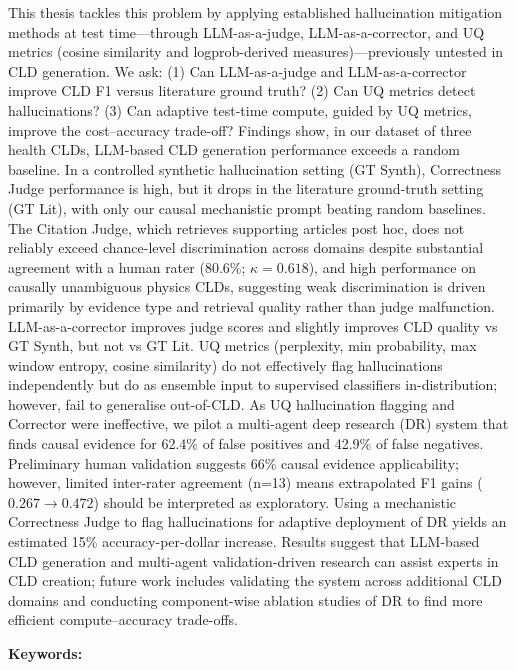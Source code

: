 \documentclass[11pt, oneside]{Thesis} %
\begin{document}
{This thesis tackles this problem by applying established hallucination mitigation methods at test time---through LLM-as-a-judge, LLM-as-a-corrector, and UQ metrics (cosine similarity and logprob-derived measures)---previously untested in CLD generation. We ask: (1) Can LLM-as-a-judge and LLM-as-a-corrector improve CLD F1 versus literature ground truth? (2) Can UQ metrics detect hallucinations? (3) Can adaptive test-time compute, guided by UQ metrics, improve the cost--accuracy trade-off? Findings show, in our dataset of three health CLDs, LLM-based CLD generation performance exceeds a random baseline. In a controlled synthetic hallucination setting (GT Synth), Correctness Judge performance is high, but it drops in the literature ground-truth setting (GT Lit), with only our causal mechanistic prompt beating random baselines. The Citation Judge, which retrieves supporting articles post hoc, does not reliably exceed chance-level discrimination across domains despite substantial agreement with a human rater (80.6\%; $\kappa=0.618$), and high performance on causally unambiguous physics CLDs, suggesting weak discrimination is driven primarily by evidence type and retrieval quality rather than judge malfunction. LLM-as-a-corrector improves judge scores and slightly improves CLD quality vs GT Synth, but not vs GT Lit. UQ metrics (perplexity, min probability, max window entropy, cosine similarity) do not effectively flag hallucinations independently but do as ensemble input to supervised classifiers in-distribution; however, fail to generalise out-of-CLD. As UQ hallucination flagging and Corrector were ineffective, we pilot a multi-agent deep research (DR) system that finds causal evidence for 62.4\% of false positives and 42.9\% of false negatives. Preliminary human validation suggests 66\% causal evidence applicability; however, limited inter-rater agreement (n=13) means extrapolated F1 gains ($0.267 \to 0.472$) should be interpreted as exploratory. Using a mechanistic Correctness Judge to flag hallucinations for adaptive deployment of DR yields an estimated 15\% accuracy-per-dollar increase. Results suggest that LLM-based CLD generation and multi-agent validation-driven research can assist experts in CLD creation; future work includes validating the system across additional CLD domains and conducting component-wise ablation studies of DR to find more efficient compute--accuracy trade-offs.

\vspace{0.75em}
\noindent\textbf{Keywords:} \keywordnames
}
\end{document}
